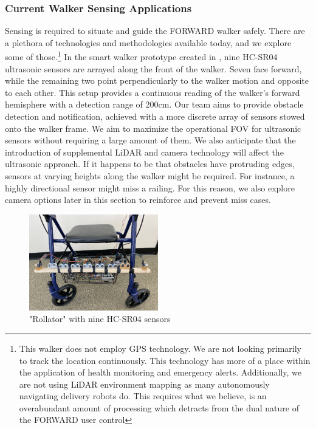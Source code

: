 \subsubsection{Current Walker Sensing Applications}
\noindent Sensing is required to situate and guide the FORWARD walker safely. There are a plethora of technologies and methodologies available today, and we explore some of those.\footnote{\noindent This walker does not employ GPS technology. We are not looking primarily to track the location continuously. This technology has more of a place within the application of health monitoring and emergency alerts. Additionally, we are not using LiDAR environment mapping as many autonomously navigating delivery robots do. This requires what we believe, is an overabundant amount of processing which detracts from the dual nature of the FORWARD user control} In the smart walker prototype created in \cite{Mostofa}, nine HC-SR04 ultrasonic sensors are arrayed along the front of the walker. Seven face forward, while the remaining two point perpendicularly to the walker motion and opposite to each other. This setup provides a continuous reading of the walker's forward hemisphere with a detection range of 200cm. Our team aims to provide obstacle detection and notification, achieved with a more discrete array of sensors stowed onto the walker frame. We aim to maximize the operational FOV for ultrasonic sensors without requiring a large amount of them. We also anticipate that the introduction of supplemental LiDAR and camera technology will affect the ultrasonic approach. If it happens to be that obstacles have protruding edges, sensors at varying heights along the walker might be required. For instance, a highly directional sensor might miss a railing. For this reason, we also explore camera options later in this section to reinforce and prevent miss cases.\\

\begin{figure}[H]
	\centering
	\includegraphics[width=0.5\textwidth]{./Images/mostafa9.png}
	\caption{\label{fig:mostafa9}"Rollator" with nine HC-SR04 sensors \cite{Mostofa}}
\end{figure}

